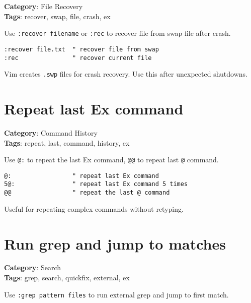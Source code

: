 {{{{{\textbf{Category}: File Recovery\\ \textbf{Tags}: recover, swap, file, crash, ex
\vspace{0.5cm}

Use {\footnotesize \Verb§:recover filename§} or {\footnotesize \Verb§:rec§} to recover file from swap file after crash.

\begin{Exa*}{}
\begin{Verbatim}[fontsize=\footnotesize, breaklines, breakanywhere]
:recover file.txt  " recover file from swap
:rec               " recover current file
\end{Verbatim}
\end{Exa*}

Vim creates {\footnotesize \Verb§.swp§} files for crash recovery. Use this after unexpected shutdowns.

\section{Repeat last Ex command}

\textbf{Category}: Command History\\ \textbf{Tags}: repeat, last, command, history, ex
\vspace{0.5cm}

Use {\footnotesize \Verb§@:§} to repeat the last Ex command, {\footnotesize \Verb§@@§} to repeat last {\footnotesize \Verb§@§} command.

\begin{Exa*}{}
\begin{Verbatim}[fontsize=\footnotesize, breaklines, breakanywhere]
@:                 " repeat last Ex command
5@:                " repeat last Ex command 5 times
@@                 " repeat the last @ command
\end{Verbatim}
\end{Exa*}

Useful for repeating complex commands without retyping.

\section{Run grep and jump to matches}

\textbf{Category}: Search\\ \textbf{Tags}: grep, search, quickfix, external, ex
\vspace{0.5cm}

Use {\footnotesize \Verb§:grep pattern files§} to run external grep and jump to first match.

}}}}}
